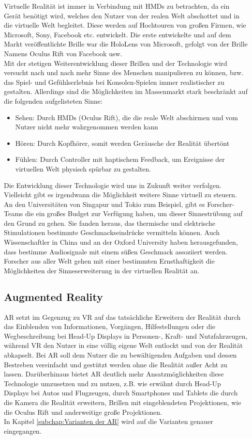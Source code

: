 Virtuelle Realität ist immer in Verbindung mit \acl{HMD}s zu betrachten, da ein Gerät benötigt wird, welches den Nutzer von der realen Welt 
abschottet und in die virtuelle Welt begleitet. Diese werden auf Hochtouren von großen Firmen, wie Microsoft, Sony, Facebook etc. entwickelt. 
Die erste entwickelte und auf dem Markt veröffentlichte Brille war die HoloLens von Microsoft, gefolgt von der Brille Namens Oculus Rift von 
Facebook usw. 
\\ 
Mit der stetigen Weiterentwicklung dieser Brillen und der Technologie wird versucht nach und nach mehr Sinne des Menschen manipulieren zu 
können, bzw. das Spiel- und Gefühlserlebnis bei Konsolen-Spielen immer realistischer zu gestalten. Allerdings sind die Möglichkeiten im 
Massenmarkt stark beschränkt auf die folgenden aufgelisteten Sinne: 
\begin{itemize}
    \item Sehen: Durch \acl{HMD}s (Oculus Rift), die die reale Welt abschirmen und vom Nutzer nicht mehr wahrgenommen werden kann
    \item Hören: Durch Kopfhörer, somit werden Geräusche der Realität übertönt 
    \item Fühlen: Durch Controller mit haptischem Feedback, um Ereignisse der virtuellen Welt physisch spürbar zu gestalten. 
\end{itemize}
Die Entwicklung dieser Technologie wird uns in Zukunft weiter verfolgen. Vielleicht gibt es irgendwann die Möglichkeit weitere Sinne virtuell 
zu steuern. An den Universitäten von Singapur und Tokio zum Beispiel, gibt es Forscher-Teams die ein großes Budget zur Verfügung haben, um 
dieser Sinnestrübung auf den Grund zu gehen. Sie fanden heraus, das thermische und elektrische Stimulationen bestimmte Geschmackseindrücke 
vermitteln können. Auch Wissenschaftler in China und an der Oxford University haben herausgefunden, dass bestimme Audiosignale mit einem süßen 
Geschmack assoziiert werden. \cite{sinnesforschung.2017m} Forscher aus aller Welt gehen mit einer bestimmten Ernsthaftigkeit die Möglichkeiten 
der Sinneserweiterung in der virtuellen Realität an.   
\subsection*{Augmented Reality}
\ac{AR} setzt im Gegenzug zu \ac{VR} auf das tatsächliche Erweitern der Realität durch das Einblenden von Informationen, Vorgängen, Hilfestellungen
oder die Wegbeschreibung bei Head-Up Displays in Personen-, Kraft- und Nutzfahrzeugen, während \acl{VR} den Nutzer in eine völlig eigene 
Welt entlockt und von der Realität abkapselt. Bei \acs{AR} soll dem Nutzer die zu bewältigenden Aufgaben und dessen Bestreben vereinfacht und 
gestützt werden ohne die Realität außer Acht zu lassen. Darüberhinaus bietet \acl{AR} deutlich mehr Ansatzmöglichkeiten diese Technologie 
umzusetzen und zu nutzen, z.B. wie erwähnt durch Head-Up Displays bei Autos und Flugzeugen, durch Smartphones und Tablets die durch die Kamera 
die Realität erweitern, Brillen mit eingeblendeten Projektionen, wie die Oculus Rift und anderweitige große Projektionen. 
\\ 
In Kapitel \ref{subchap:Varianten der AR} wird auf die Varianten genauer eingegangen. 

